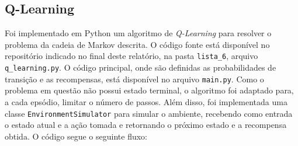 \subsection*{Q-Learning}

Foi implementado em Python um algoritmo de \textit{Q-Learning} para resolver o problema da cadeia de Markov descrita. O código fonte está disponível no repositório indicado no final deste relatório, na pasta \texttt{lista\_6}, arquivo \texttt{q\_learning.py}. O código principal, onde são definidas as probabilidades de transição e as recompensas, está disponível no arquivo \texttt{main.py}. Como o problema em questão não possui estado terminal, o algoritmo foi adaptado para, a cada epsódio, limitar o número de passos. Além disso, foi implementada uma classe \texttt{EnvironmentSimulator} para simular o ambiente, recebendo como entrada o estado atual e a ação tomada e retornando o próximo estado e a recompensa obtida. O código segue o seguinte fluxo:

